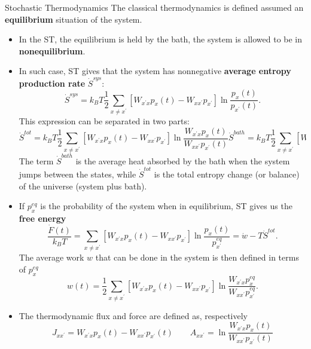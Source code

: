 \documentclass[final]{beamer}
\newlength{\colwidth}
\begin{document}
\begin{frame}[t]
\begin{columns}[t]
\begin{column}{\colwidth}
\begin{block}{Stochastic Thermodynamics}
The classical thermodynamics is defined assumed an {\bf equilibrium} situation of the system.
\begin{itemize}
\item In the ST, the equilibrium is held by the bath, the system is allowed to be in {\bf nonequilibrium}.
\item In such case, ST gives that the system has nonnegative {\bf average entropy production rate} $\dot{S}^{sys}$:
%
\begin{equation}
\dot{S}^{sys} = k_B T \frac{1}{2} \sum_{x \neq x^\prime} \left[ W_{x^\prime x} p_x(t) -  W_{x x^\prime}p_{x^\prime} \right] \ln \frac{p_x(t)}{p_{x^\prime}(t)}.
\end{equation}
%
This expression can be separated in two parts:
\begin{subequations}
\begin{equation}
\dot{S}^{tot}  = k_B T\frac{1}{2} \sum_{x \neq x^\prime} \left[ W_{x^\prime x} p_x(t) -  W_{x x^\prime}p_{x^\prime} \right] \ln \frac{W_{x^\prime x} p_x(t)}{W_{xx^\prime}p_{x^\prime}(t)}
\end{equation}
\begin{equation}
\dot{S}^{bath}  = k_B T \frac{1}{2} \sum_{x \neq x^\prime} \left[ W_{x^\prime x} p_x(t) -  W_{x x^\prime}p_{x^\prime}(t) \right] \ln \frac{W_{x^\prime x}}{W_{xx^\prime}}
\end{equation}
\end{subequations}
The term $\dot{S}^{bath}$ is the average heat absorbed by the bath when the system jumps between the states, while $\dot{S}^{tot}$ is the total entropy change (or balance) of the universe (system plus bath).

\item If $p_x^{eq}$ is the probability of the system when in equilibrium, ST gives us the {\bf free energy}
%
\begin{equation}
\frac{\dot{F}(t)}{k_B T} = \sum_{x \neq x^\prime} \left[ W_{x^\prime x} p_x(t) -  W_{x x^\prime}p_{x^\prime} \right] \ln \frac{p_x(t)}{p_{x^\prime}^{eq}} = \dot{w} - T \dot{S}^{tot}.
\end{equation}
The average work $w$ that can be done in the system is then defined in terms of $p_x^{eq}$
\begin{equation}
w(t) = \frac{1}{2} \sum_{x \neq x^\prime} \left[ W_{x^\prime x} p_x(t) -  W_{x x^\prime}p_{x^\prime} \right] \ln \frac{W_{x^\prime x} p_x^{eq}}{W_{xx^\prime}p_{x^\prime}^{eq}}.
\end{equation}
\item The thermodynamic flux and force are defined as, respectively
%
\begin{equation}
J_{xx^\prime} = W_{x^\prime x} p_x(t) -  W_{x x^\prime}p_{x^\prime}(t) \qquad A_{xx^\prime} =  \ln \frac{W_{x^\prime x} p_x(t)}{W_{xx^\prime}p_{x^\prime}(t)}
\label{eq therm-flux-force}
\end{equation}
\end{itemize}
\end{block}


\end{column}
\end{columns}
\end{frame}
\end{document}
